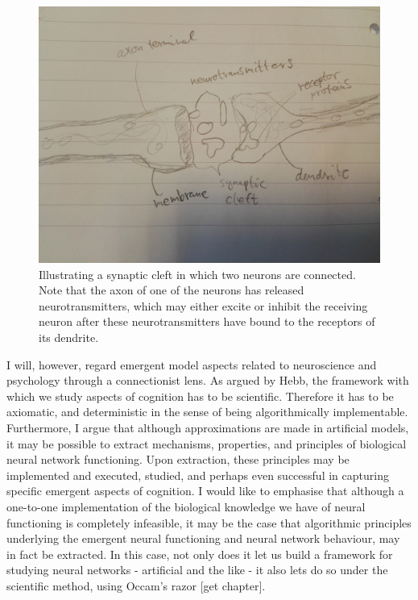 \begin{figure}
    \centering
    \includegraphics[width=12cm]{fig/synaptic-cleft.jpg}
    \caption{Illustrating a synaptic cleft in which two neurons are connected. Note that the axon of one of the neurons has released neurotransmitters, which may either excite or inhibit the receiving neuron after these neurotransmitters have bound to the receptors of its dendrite.}
    \label{fig:synaptic-cleft}
\end{figure}

I will, however, regard emergent model aspects related to neuroscience and psychology through a connectionist lens. As argued by Hebb, the framework with which we study aspects of cognition has to be scientific. Therefore it has to be axiomatic, and deterministic in the sense of being algorithmically implementable. Furthermore, I argue that although approximations are made in artificial models, it may be possible to extract mechanisms, properties, and principles of biological neural network functioning. Upon extraction, these principles may be implemented and executed, studied, and perhaps even successful in capturing specific emergent aspects of cognition. I would like to emphasise that although a one-to-one implementation of the biological knowledge we have of neural functioning is completely infeasible, it may be the case that algorithmic principles underlying the emergent neural functioning and neural network behaviour, may in fact be extracted. In this case, not only does it let us build a framework for studying neural networks - artificial and the like - it also lets do so under the scientific method, using Occam's razor \cite{Russell2009}[get chapter].

